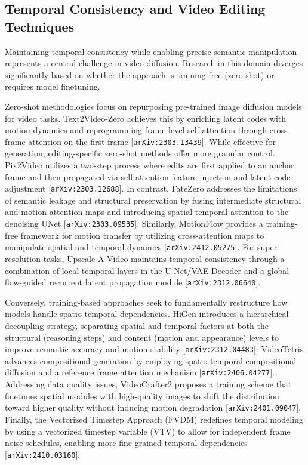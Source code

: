\documentclass[11pt]{article}
\begin{document}
\subsection{Temporal Consistency and Video Editing Techniques}

Maintaining temporal consistency while enabling precise semantic manipulation represents a central challenge in video diffusion. Research in this domain diverges significantly based on whether the approach is training-free (zero-shot) or requires model finetuning.

Zero-shot methodologies focus on repurposing pre-trained image diffusion models for video tasks. Text2Video-Zero achieves this by enriching latent codes with motion dynamics and reprogramming frame-level self-attention through cross-frame attention on the first frame [\texttt{arXiv:2303.13439}]. While effective for generation, editing-specific zero-shot methods offer more granular control. Pix2Video utilizes a two-step process where edits are first applied to an anchor frame and then propagated via self-attention feature injection and latent code adjustment [\texttt{arXiv:2303.12688}]. In contrast, FateZero addresses the limitations of semantic leakage and structural preservation by fusing intermediate structural and motion attention maps and introducing spatial-temporal attention to the denoising UNet [\texttt{arXiv:2303.09535}]. Similarly, MotionFlow provides a training-free framework for motion transfer by utilizing cross-attention maps to manipulate spatial and temporal dynamics [\texttt{arXiv:2412.05275}]. For super-resolution tasks, Upscale-A-Video maintains temporal consistency through a combination of local temporal layers in the U-Net/VAE-Decoder and a global flow-guided recurrent latent propagation module [\texttt{arXiv:2312.06640}].

Conversely, training-based approaches seek to fundamentally restructure how models handle spatio-temporal dependencies. HiGen introduces a hierarchical decoupling strategy, separating spatial and temporal factors at both the structural (reasoning steps) and content (motion and appearance) levels to improve semantic accuracy and motion stability [\texttt{arXiv:2312.04483}]. VideoTetris advances compositional generation by employing spatio-temporal compositional diffusion and a reference frame attention mechanism [\texttt{arXiv:2406.04277}]. Addressing data quality issues, VideoCrafter2 proposes a training scheme that finetunes spatial modules with high-quality images to shift the distribution toward higher quality without inducing motion degradation [\texttt{arXiv:2401.09047}]. Finally, the Vectorized Timestep Approach (FVDM) redefines temporal modeling by using a vectorized timestep variable (VTV) to allow for independent frame noise schedules, enabling more fine-grained temporal dependencies [\texttt{arXiv:2410.03160}].
\end{document}
